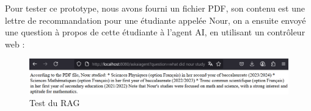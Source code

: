 \documentclass[12pt,a4paper]{report}
\begin{document}
	Pour tester ce prototype, nous avons fourni un fichier PDF, son contenu est une lettre de recommandation pour une étudiante appelée Nour, on a ensuite envoyé une question à propos de cette étudiante à l'agent AI, en utilisant un contrôleur web :
	
	\begin{figure}[H]
		\centering
		\includegraphics[width=\textwidth]{test-rag.png}
		\caption{Test du RAG}
		\label{fig:test-rag}
	\end{figure}
	
	
	
\end{document}
